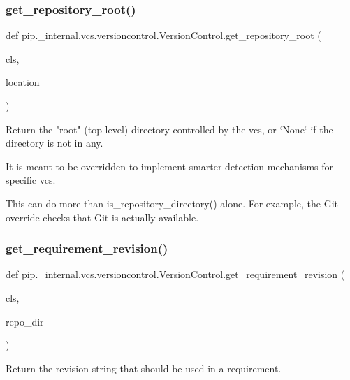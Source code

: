 \subsubsection{\texorpdfstring{get\+\_\+repository\+\_\+root()}{get\_repository\_root()}}
{\footnotesize\ttfamily def pip.\+\_\+internal.\+vcs.\+versioncontrol.\+Version\+Control.\+get\+\_\+repository\+\_\+root (\begin{DoxyParamCaption}\item[{}]{cls,  }\item[{}]{location }\end{DoxyParamCaption})}

\begin{DoxyVerb}Return the "root" (top-level) directory controlled by the vcs,
or `None` if the directory is not in any.

It is meant to be overridden to implement smarter detection
mechanisms for specific vcs.

This can do more than is_repository_directory() alone. For
example, the Git override checks that Git is actually available.
\end{DoxyVerb}
 \mbox{\label{classpip_1_1__internal_1_1vcs_1_1versioncontrol_1_1VersionControl_a603f9575e454d2e9e33187bf6defbe75}} 
\subsubsection{\texorpdfstring{get\+\_\+requirement\+\_\+revision()}{get\_requirement\_revision()}}
{\footnotesize\ttfamily def pip.\+\_\+internal.\+vcs.\+versioncontrol.\+Version\+Control.\+get\+\_\+requirement\+\_\+revision (\begin{DoxyParamCaption}\item[{}]{cls,  }\item[{}]{repo\+\_\+dir }\end{DoxyParamCaption})}

\begin{DoxyVerb}Return the revision string that should be used in a requirement.
\end{DoxyVerb}
 \mbox{\label{classpip_1_1__internal_1_1vcs_1_1versioncontrol_1_1VersionControl_aab649d220bff1dd8e589fdd211cddce9}} 
